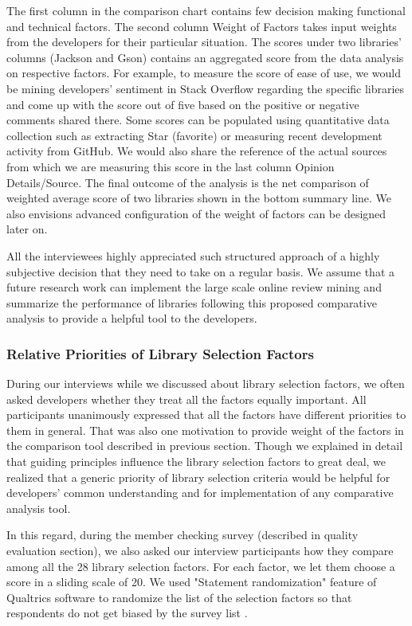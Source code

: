 The first column in the comparison chart contains few decision making functional and technical factors. The second column Weight of Factors takes input weights from the developers for their particular situation. The scores under two libraries' columns (Jackson and Gson) contains an aggregated score from the data analysis on respective factors. For example, to measure the score of ease of use, we would be mining developers' sentiment in Stack Overflow regarding the specific libraries and come up with the score out of five based on the positive or negative comments shared there. Some scores can be populated using quantitative data collection such as extracting Star (favorite) or measuring recent development activity from GitHub. We would also share the reference of the actual sources from which we are measuring this score in the last column Opinion Details/Source. The final outcome of the analysis is the net comparison of weighted average score of two libraries shown in the bottom summary line. We also envisions advanced configuration of the weight of factors can be designed later on.

All the interviewees highly appreciated such structured approach of a highly subjective decision that they need to take on a regular basis. We assume that a future research work can implement the large scale online review mining and summarize the performance of libraries following this proposed comparative analysis to provide a helpful tool to the developers.


\subsubsection{Relative Priorities of Library Selection Factors}
During our interviews while we discussed about library selection factors, we often asked developers whether they treat all the factors equally important. All participants unanimously expressed that all the factors have different priorities to them in general. That was also one motivation to provide weight of the factors in the comparison tool described in previous section. Though we explained in detail that guiding principles influence the library selection factors to great deal, we realized that a generic priority of library selection criteria would be helpful for developers' common understanding and for implementation of any comparative analysis tool.


In this regard, during the member checking survey (described in quality evaluation section), we also asked our interview participants how they compare among all the 28 library selection factors. For each factor, we let them choose a score in a sliding scale of 20. We used "Statement randomization" feature of Qualtrics software to randomize the list of the selection factors so that respondents do not get biased by the survey list \cite{website:replication-package}. 

